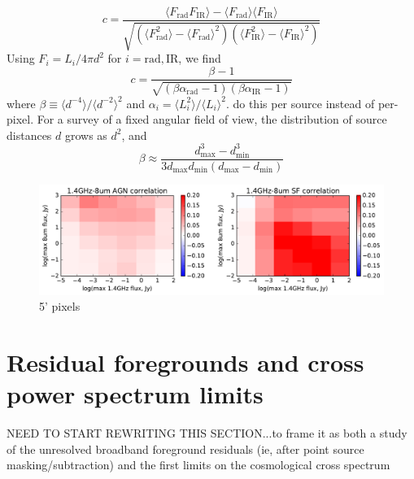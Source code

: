 \documentclass[preprint]{aastex}
\newcommand{\mintext}{\text{min}}
\newcommand{\maxtext}{\text{max}}
\newcommand{\rad}{\text{rad}}
\newcommand{\ir}{\text{IR}}
\begin{document}
\begin{equation}
	c = \frac{\langle F_\rad F_\ir \rangle-\langle F_\rad\rangle\langle F_\ir\rangle}{\sqrt{(\langle F_\rad^2\rangle-\langle F_\rad\rangle^2)(\langle F_\ir^2\rangle-\langle F_\ir\rangle^2)}}
\end{equation}
Using $F_i=L_i/4\pi d^2$ for $i=\rad,\ir$, we find
\begin{equation}
	c = \frac{\beta-1}{\sqrt{(\beta\alpha_\rad-1)(\beta\alpha_\ir-1)}}
\end{equation}
where $\beta\equiv\langle d^{-4}\rangle/\langle d^{-2}\rangle^2$ and $\alpha_i=\langle L_i^2\rangle/\langle L_i\rangle^2$.
do this per source instead of per-pixel. For a survey of a fixed angular field of view, the distribution of source distances $d$ grows as $d^2$, and 
\begin{equation}
	\beta\approx\frac{d_\maxtext^3-d_\mintext^3}{3d_\maxtext d_\mintext (d_\maxtext-d_\mintext)}
\end{equation}





\begin{figure}[h]
\centering
\includegraphics[width=6in]{images/sim_correlation_agn_and_sf.pdf}
\caption{5' pixels}
\label{fig:simagnlfcorrelations}
\end{figure}






\section{Residual foregrounds and cross power spectrum limits}

NEED TO START REWRITING THIS SECTION...to frame it as both a study of the unresolved broadband foreground residuals (ie, after point source masking/subtraction) and the first limits on the cosmological cross spectrum
\end{document}

